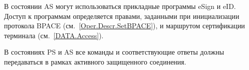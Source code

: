 В состоянии AS могут использоваться прикладные программы eSign и eID.
Доступ к программам определяется правами, 
заданными при инициализации протокола BPACE (см.~\ref{Oper.Descr.SetBPACE}), 
и маршрутом сертификации терминала (см.~\ref{DATA.Access}).

В состояниях PS и AS все команды и соответствующие ответы должны передаваться 
в рамках активного защищенного соединения. 


